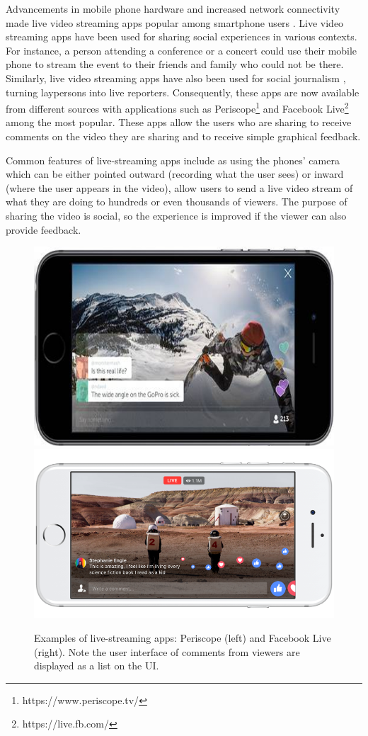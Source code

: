 Advancements in mobile phone hardware and increased network connectivity made live video streaming apps popular among smartphone users \cite{Liu2008}. Live video streaming apps have been used for sharing social experiences in various contexts. For instance, a person attending a conference or a concert could use their mobile phone to stream the event to their friends and family who could not be there. Similarly, live video streaming apps have also been used for social journalism \cite{Lenzner2014}, turning laypersons into live reporters. Consequently, these apps are now available from different sources with applications such as Periscope\footnote{https://www.periscope.tv/} and Facebook Live\footnote{https://live.fb.com/} among the most popular. These apps allow the users who are sharing to receive comments on the video they are sharing and to receive simple graphical feedback. 

Common features of live-streaming apps include as using the phones' camera which can be either pointed outward (recording what the user sees) or inward (where the user appears in the video), allow users to send a live video stream of what they are doing to hundreds or even thousands of viewers. The purpose of sharing the video is social, so the experience is improved if the viewer can also provide feedback.

\begin{figure}
    \centering
    \includegraphics[width=0.4\linewidth]{images/periscope.png}
    \includegraphics[width=0.4\linewidth]{images/facebook-live.png}
    \caption{Examples of live-streaming apps: Periscope (left) and Facebook Live (right). Note the user interface of comments from viewers are displayed as a list on the UI.}
    \label{fig:live-streaming}
\end{figure}


